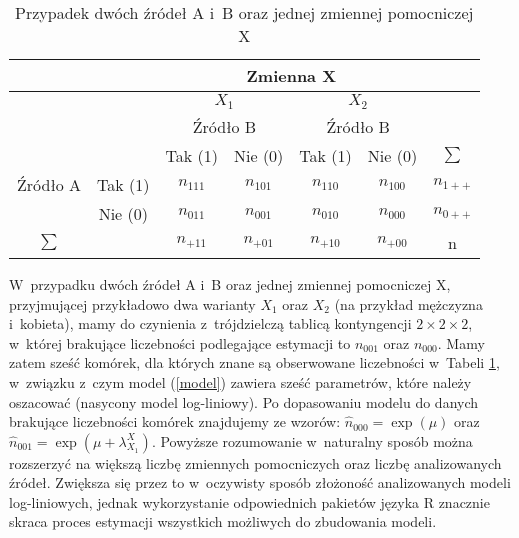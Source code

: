 \documentclass[12pt,a4paper]{article}
\providecommand{\DIFadd}[1]{{\protect\color{blue}\uwave{#1}}} %
\providecommand{\DIFaddbegin}{} %
\providecommand{\DIFaddend}{} %
\begin{document}
\begin{table}[ht]
\centering
\caption{Przypadek dwóch źródeł A i~B oraz jednej zmiennej pomocniczej X}\label{tab3}
\begin{tabular}{l|llllll}
\hline
\multicolumn{1}{c|}{} & \multicolumn{1}{c}{} & \multicolumn{4}{c}{Zmienna X} & \multicolumn{1}{c}{} \\ 
\hline
\multicolumn{1}{c|}{} & \multicolumn{1}{c}{} & \multicolumn{2}{c}{$X_{1}$} & \multicolumn{2}{c}{$X_{2}$} & \multicolumn{1}{c}{} \\ 
\hline
\multicolumn{1}{c|}{} & \multicolumn{1}{c}{} & \multicolumn{2}{c}{Źródło B} & \multicolumn{2}{c}{Źródło B} & \multicolumn{1}{c}{} \\ 
\hline
\multicolumn{1}{c|}{} & \multicolumn{1}{c}{} & \multicolumn{1}{c}{Tak (1)} & \multicolumn{1}{c}{Nie (0)} & \multicolumn{1}{c}{Tak (1)} & \multicolumn{1}{c}{Nie (0)} & \multicolumn{1}{c}{$\sum$} \\ 
\multicolumn{1}{c|}{Źródło A} & \multicolumn{1}{c}{Tak (1)} & \multicolumn{1}{c}{$n_{111}$} & \multicolumn{1}{c}{$n_{101}$} & \multicolumn{1}{c}{$n_{110}$} & \multicolumn{1}{c}{$n_{100}$} & \multicolumn{1}{c}{$n_{1++}$} \\ 
\multicolumn{1}{c|}{} & \multicolumn{1}{c}{Nie (0)} & \multicolumn{1}{c}{$n_{011}$} & \multicolumn{1}{c}{$n_{001}$} & \multicolumn{1}{c}{$n_{010}$} & \multicolumn{1}{c}{$n_{000}$} & \multicolumn{1}{c}{$n_{0++}$} \\ 
\hline
\multicolumn{1}{c|}{$\sum$} & \multicolumn{1}{c}{} &  \multicolumn{1}{c}{$n_{+11}$} & \multicolumn{1}{c}{$n_{+01}$} & \multicolumn{1}{c}{$n_{+10}$} & \multicolumn{1}{c}{$n_{+00}$} & \multicolumn{1}{c}{n} \\ 
\hline
\end{tabular}
\end{table}

W~przypadku dwóch źródeł A i~B oraz jednej zmiennej pomocniczej X, przyjmującej przykładowo dwa warianty $X_{1}$ oraz $X_{2}$ (na przykład mężczyzna i~kobieta), mamy do czynienia z~trójdzielczą tablicą kontyngencji $2\times 2 \times 2$, w~której brakujące liczebności podlegające estymacji to $n_{001}$ oraz $n_{000}$. Mamy zatem sześć komórek, dla których znane są obserwowane liczebności w~Tabeli \ref{tab3}, w~związku z~czym model (\ref{model}) zawiera sześć parametrów, które należy oszacować (nasycony model log-liniowy).  Po dopasowaniu modelu do danych brakujące liczebności komórek znajdujemy ze wzorów:  $\hat{n}_{000}=\exp\left(\mu\right)$ oraz  $\hat{n}_{001}=\exp\left(\mu+\lambda^{X}_{X_{1}}\right)$. Powyższe rozumowanie w~naturalny sposób można rozszerzyć na większą liczbę zmiennych pomocniczych oraz liczbę analizowanych źródeł. Zwiększa się przez to w~oczywisty sposób złożoność analizowanych modeli log-liniowych, jednak wykorzystanie odpowiednich pakietów \DIFaddbegin \DIFadd{(np. }\texttt{\DIFadd{stats}} \DIFadd{i }\texttt{\DIFadd{parallel}}\DIFadd{) }\DIFaddend języka R \DIFaddbegin \DIFadd{\mbox{%
\citep{r-cran} }\hspace{0pt}%
}\DIFaddend znacznie skraca proces estymacji wszystkich możliwych do zbudowania modeli.         
\end{document}
